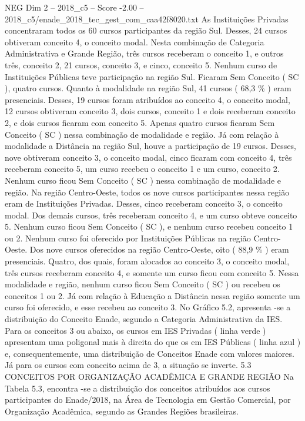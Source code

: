 \begin{textsample}{NEG Dim 2 – 2018\_c5 – Score -2.00 – 2018\_c5/enade\_2018\_tec\_gest\_com\_caa42f8020.txt}
As Instituições Privadas concentraram todos os 60 cursos participantes da região Sul.
Desses, 24 cursos obtiveram conceito 4, o conceito modal.
Nesta combinação de Categoria Administrativa e Grande Região, três cursos receberam o conceito 1, e outros três, conceito 2, 21 cursos, conceito 3, e cinco, conceito 5.
Nenhum curso de Instituições Públicas teve participação na região Sul.
Ficaram Sem Conceito ( SC ), quatro cursos.
Quanto à modalidade na região Sul, 41 cursos ( 68,3 \% ) eram presenciais.
Desses, 19 cursos foram atribuídos ao conceito 4, o conceito modal, 12 cursos obtiveram conceito 3, dois cursos, conceito 1 e dois receberam conceito 2, e dois cursos ficaram com conceito 5.
Apenas quatro cursos ficaram Sem Conceito ( SC ) nessa combinação de modalidade e região.
Já com relação à modalidade a Distância na região Sul, houve a participação de 19 cursos.
Desses, nove obtiveram conceito 3, o conceito modal, cinco ficaram com conceito 4, três receberam conceito 5, um curso recebeu o conceito 1 e um curso, conceito 2.
Nenhum curso ficou Sem Conceito ( SC ) nessa combinação de modalidade e região.
Na região Centro-Oeste, todos os nove cursos participantes nessa região eram de Instituições Privadas.
Desses, cinco receberam conceito 3, o conceito modal.
Dos demais cursos, três receberam conceito 4, e um curso obteve conceito 5.
Nenhum curso ficou Sem Conceito ( SC ), e nenhum curso recebeu conceito 1 ou 2.
Nenhum curso foi oferecido por Instituições Públicas na região Centro-Oeste.
Dos nove cursos oferecidos na região Centro-Oeste, oito ( 88,9 \% ) eram presenciais.
Quatro, dos quais, foram alocados ao conceito 3, o conceito modal, três cursos receberam conceito 4, e somente um curso ficou com conceito 5.
Nessa modalidade e região, nenhum curso ficou Sem Conceito ( SC ) ou recebeu os conceitos 1 ou 2.
Já com relação à Educação a Distância nessa região somente um curso foi oferecido, e esse recebeu ao conceito 3.
No Gráfico 5.2, apresenta -se a distribuição do Conceito Enade, segundo a Categoria Administrativa da IES.
Para os conceitos 3 ou abaixo, os cursos em IES Privadas ( linha verde ) apresentam uma poligonal mais à direita do que os em IES Públicas ( linha azul ) e, consequentemente, uma distribuição de Conceitos Enade com valores maiores.
Já para os cursos com conceito acima de 3, a situação se inverte. 5.3 CONCEITOS POR ORGANIZAÇÃO ACADÊMICA E GRANDE REGIÃO Na Tabela 5.3, encontra -se a distribuição dos conceitos atribuídos aos cursos participantes do Enade/2018, na Área de Tecnologia em Gestão Comercial, por Organização Acadêmica, segundo as Grandes Regiões brasileiras.

\end{textsample}
